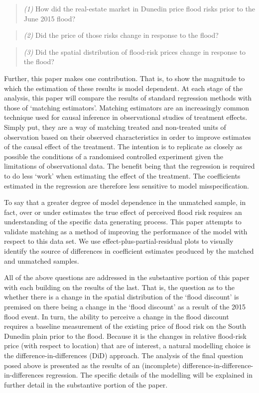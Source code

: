 \documentclass[]{article}
\begin{document}
\begin{quote}
\emph{(1)} How did the real-estate market in Dunedin price flood risks
prior to the June 2015 flood?
\end{quote}

\begin{quote}
\emph{(2)} Did the price of those risks change in response to the flood?
\end{quote}

\begin{quote}
\emph{(3)} Did the spatial distribution of flood-risk prices change in
response to the flood?
\end{quote}

Further, this paper makes one contribution. That is, to show the
magnitude to which the estimation of these results is model dependent.
At each stage of the analysis, this paper will compare the results of
standard regression methods with those of `matching estimators'.
Matching estimators are an increasingly common technique used for causal
inference in observational studies of treatment effects. Simply put,
they are a way of matching treated and non-treated units of observation
based on their observed characteristics in order to improve estimates of
the causal effect of the treatment. The intention is to replicate as
closely as possible the conditions of a randomised controlled experiment
given the limitations of observational data. The benefit being that the
regression is required to do less `work' when estimating the effect of
the treatment. The coefficients estimated in the regression are
therefore less sensitive to model misspecification.

To say that a greater degree of model dependence in the unmatched
sample, in fact, over or under estimates the true effect of perceived
flood risk requires an understanding of the specific data generating
process. This paper attempts to validate matching as a method of
improving the performance of the model with respect to this data set. We
use effect-plus-partial-residual plots to visually identify the source
of differences in coefficient estimates produced by the matched and
unmatched samples.

All of the above questions are addressed in the substantive portion of
this paper with each building on the results of the last. That is, the
question as to the whether there is a change in the spatial distribution
of the `flood discount' is premised on there being a change in the
`flood discount' as a result of the 2015 flood event. In turn, the
ability to perceive a change in the flood discount requires a baseline
measurement of the existing price of flood risk on the South Dunedin
plain prior to the flood. Because it is the changes in relative
flood-risk price (with respect to location) that are of interest, a
natural modelling choice is the difference-in-differences (DiD)
approach. The analysis of the final question posed above is presented as
the results of an (incomplete) difference-in-difference-in-differences
regression. The specific details of the modelling will be explained in
further detail in the substantive portion of the paper.
\end{document}
